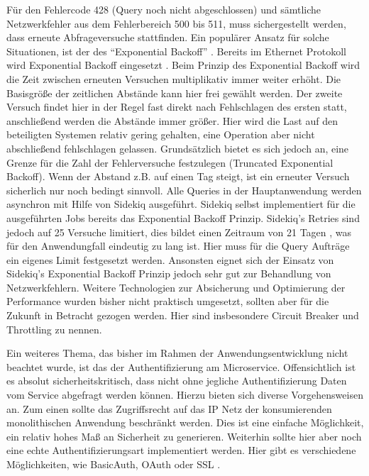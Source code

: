 Für den Fehlercode 428 (Query noch nicht abgeschlossen) und sämtliche Netzwerkfehler aus dem Fehlerbereich 500 bis 511, muss sichergestellt werden, dass erneute Abfrageversuche stattfinden.
Ein populärer Ansatz für solche Situationen, ist der des ``Exponential Backoff'' \cite{expbackoff}. Bereits im Ethernet Protokoll wird Exponential Backoff eingesetzt \cite{etherbackoff}. Beim Prinzip des Exponential Backoff wird die Zeit zwischen erneuten Versuchen multiplikativ immer weiter erhöht. Die Basisgröße der zeitlichen Abstände kann hier frei gewählt werden. Der zweite Versuch findet hier in der Regel fast direkt nach Fehlschlagen des ersten statt, anschließend werden die Abstände immer größer. Hier wird die Last auf den beteiligten Systemen relativ gering gehalten, eine Operation aber nicht abschließend fehlschlagen gelassen. Grundsätzlich bietet es sich jedoch an, eine Grenze für die Zahl der Fehlerversuche festzulegen (Truncated Exponential Backoff). Wenn der Abstand z.B. auf einen Tag steigt, ist ein erneuter Versuch sicherlich nur noch bedingt sinnvoll.
Alle Queries in der Hauptanwendung werden asynchron mit Hilfe von Sidekiq \cite{sidekiq} ausgeführt. Sidekiq selbst implementiert für die ausgeführten Jobs bereits das Exponential Backoff Prinzip. Sidekiq's Retries sind jedoch auf 25 Versuche limitiert, dies bildet einen Zeitraum von 21 Tagen \cite{sidekiq:errors}, was für den Anwendungfall eindeutig zu lang ist. Hier muss für die Query Aufträge ein eigenes Limit festgesetzt werden. Ansonsten eignet sich der Einsatz von Sidekiq's Exponential Backoff Prinzip jedoch sehr gut zur Behandlung von Netzwerkfehlern. 
Weitere Technologien zur Absicherung und Optimierung der Performance wurden bisher nicht praktisch umgesetzt, sollten aber für die Zukunft in Betracht gezogen werden. Hier sind insbesondere Circuit Breaker \cite{MSDN:Circuit} \cite{Fowler:Circuit} und Throttling \cite{MSDN:Throttling} zu nennen.

Ein weiteres Thema, das bisher im Rahmen der Anwendungsentwicklung nicht beachtet wurde, ist das der Authentifizierung am Microservice. Offensichtlich ist es absolut sicherheitskritisch, dass nicht ohne jegliche Authentifizierung Daten vom Service abgefragt werden können. Hierzu bieten sich diverse Vorgehensweisen an. Zum einen sollte das Zugriffsrecht auf das IP Netz der konsumierenden monolithischen Anwendung beschränkt werden. Dies ist eine einfache Möglichkeit, ein relativ hohes Maß an Sicherheit zu generieren. Weiterhin sollte hier aber noch eine echte Authentifizierungsart implementiert werden. Hier gibt es verschiedene Möglichkeiten, wie BasicAuth, OAuth oder SSL \cite{microauth}.

